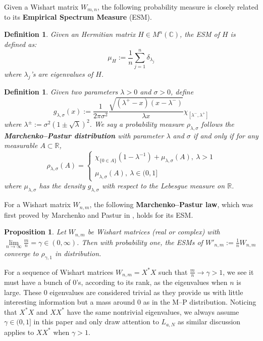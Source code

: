 \documentclass[11pt]{article}
\newtheorem{definition}[theorem]{Definition}
\newtheorem{proposition}[theorem]{Proposition}
\numberwithin{equation}{section}%
\numberwithin{theorem}{section}
\begin{document}
Given a Wishart matrix $W_{m,n}$, the following probability measure is closely related to its \textbf{Empirical Spectrum Measure} (ESM).
\begin{definition}\label{ESM}
    Given an Hermitian matrix $H\in M^n(\mathbb{C})$, the ESM of $H$ is defined as:
    \begin{equation*}
        \mu_H:=\frac{1}{n}\sum_{j=1}^n\delta_{\lambda_j}
    \end{equation*}
    where $\lambda_j$'s are eigenvalues of $H$.
\end{definition}
\begin{definition}\label{M-P law}
    Given two parameters $\lambda>0$ and $\sigma>0$, define
    \begin{equation*}
        g_{\lambda,\sigma}(x):=\frac{1}{2\pi\sigma^2}\frac{\sqrt{(\lambda^+-x)(x-\lambda^-)}}{\lambda x}\chi_{[\lambda^-,\lambda^+]}
    \end{equation*}
    where $\lambda^{\pm}:=\sigma^2(1\pm\sqrt\lambda)^2$. We say a probability measure $\rho_{\lambda,\sigma}$ follows the \textbf{Marchenko--Pastur distribution} with parameter $\lambda$ and $\sigma$ if and only if for any measurable $A\subset\mathbb{R}$,
    \begin{equation*}
        \rho_{\lambda,\sigma}(A)=\left\{\begin{array}{l}
          \chi_{\{0\in A\}}(1-\lambda^{-1})+\mu_{\lambda,\sigma}(A),~\lambda>1\\
          \\
          \mu_{\lambda,\sigma}(A),~\lambda\in(0,1]
        \end{array}\right.
    \end{equation*}
    where $\mu_{\lambda,\sigma}$ has the density $g_{\lambda,\sigma}$ with respect to the Lebesgue measure on $\mathbb{R}$.
\end{definition}
For a Wishart matrix $W_{n,m}$, the following \textbf{Marchenko--Pastur law}, which was first proved by Marchenko and Pastur in \cite{marcenko_distribution_1967}, holds for its ESM.
\begin{proposition}
    \cite[Theorem $3.6\&3.7$]{bai_spectral_2010} Let $W_{n,m}$ be Wishart matrices (real or complex) with $\lim\limits_{n\rightarrow\infty}\frac{m}{n}=\gamma\in(0,\infty)$. Then with probability one, the ESMs of $W'_{n,m}:=\frac{1}{n}W_{n,m}$ converge to $\rho_{\gamma,1}$ in distribution. 
\end{proposition}
For a sequence of Wishart matrices $W_{n,m}=X^*X$ such that $\frac{m}{n}\rightarrow\gamma>1$, we see it must have a bunch of $0$'s, according to its rank, as the eigenvalues when $n$ is large. These $0$ eigenvalues are considered trivial as they provide us with little interesting information but a mass around $0$ as in the M--P distribution. Noticing that $X^*X$ and $XX^*$ have the same nontrivial eigenvalues, we always assume $\gamma\in(0,1]$ in this paper and only draw attention to $L_{a,N}$ as similar discussion applies to $XX^*$ when $\gamma>1$. 
\end{document}
